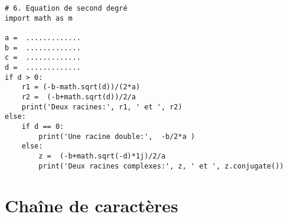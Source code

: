 \documentclass[a4paper]{article}
\begin{document}
\begin{enumerate}
\begin{lstlisting}
# 6. Equation de second degré
import math as m

a =  .............
b =  .............
c =  .............
d =  .............
if d > 0:
    r1 = (-b-math.sqrt(d))/(2*a)
    r2 =  (-b+math.sqrt(d))/2/a
    print('Deux racines:', r1, ' et ', r2)
else:
    if d == 0:
        print('Une racine double:',  -b/2*a )
    else:
        z =  (-b+math.sqrt(-d)*1j)/2/a
        print('Deux racines complexes:', z, ' et ', z.conjugate())
\end{lstlisting}

 \end{enumerate}
\section{Chaîne de caractères}
\end{document}
